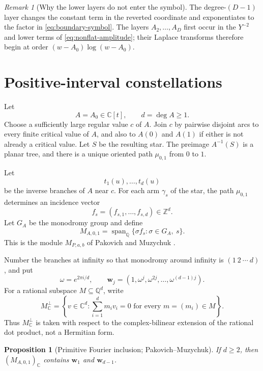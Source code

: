 \documentclass[11pt]{article}
\numberwithin{equation}{section}
\newtheorem{proposition}[proposition]{Proposition}
\theoremstyle{definition}
\theoremstyle{remark}
\newtheorem{remark}[remark]{Remark}
\newcommand{\C}{\mathbb C}
\newcommand{\Q}{\mathbb Q}
\newcommand{\Z}{\mathbb Z}
\newcommand{\Span}{\operatorname{span}}
\begin{document}
\begin{remark}[Why the lower layers do not enter the symbol]\label{rem:exact-symbol}
The degree-$(D-1)$ layer changes the constant term in the reverted coordinate and exponentiates to the factor in \eqref{eq:boundary-symbol}.  The layers $A_2,\ldots,A_D$ first occur in the $Y^{-2}$ and lower terms of \eqref{eq:nonflat-amplitude}; their Laplace transforms therefore begin at order $(w-A_0)\log(w-A_0)$.
\end{remark}

\section{Positive-interval constellations}\label{sec:constellation}

Let
\[
  A=A_0\in\C[t],\qquad d=\deg A\ge1.
\]
Choose a sufficiently large regular value $c$ of $A$.  Join $c$ by pairwise disjoint arcs to every finite critical value of $A$, and also to $A(0)$ and $A(1)$ if either is not already a critical value.  Let $S$ be the resulting star.  The preimage $A^{-1}(S)$ is a planar tree, and there is a unique oriented path $\mu_{0,1}$ from $0$ to $1$.

Let
\[
  t_1(u),\ldots,t_d(u)
\]
be the inverse branches of $A$ near $c$.  For each arm $\gamma_s$ of the star, the path $\mu_{0,1}$ determines an incidence vector
\[
  f_s=(f_{s,1},\ldots,f_{s,d})\in\Z^d.
\]
Let $G_A$ be the monodromy group and define
\begin{equation}\label{eq:incidence-module}
  M_{A,0,1}=\Span_\Q\{\sigma f_s:\sigma\in G_A,\ s\}.
\end{equation}
This is the module $M_{P,a,b}$ of Pakovich and Muzychuk \cite[\S2.1]{PakovichMuzychuk}.

Number the branches at infinity so that monodromy around infinity is $(1\ 2\ \cdots\ d)$, and put
\[
  \omega=e^{2\pi i/d},
  \qquad
  \mathbf w_j=(1,\omega^j,\omega^{2j},\ldots,\omega^{(d-1)j}).
\]
For a rational subspace $M\subseteq\Q^d$, write
\[
  M_\C^\perp
  =\left\{v\in\C^d:\sum_{i=1}^d m_iv_i=0
    \text{ for every }m=(m_i)\in M\right\}.
\]
Thus $M_\C^\perp$ is taken with respect to the complex-bilinear extension
of the rational dot product, not a Hermitian form.

\begin{proposition}[Primitive Fourier inclusion; Pakovich--Muzychuk]\label{prop:PM-Fourier}
If $d\ge2$, then $(M_{A,0,1})_\C$ contains $\mathbf w_1$ and $\mathbf w_{d-1}$.
\end{proposition}
\end{document}
